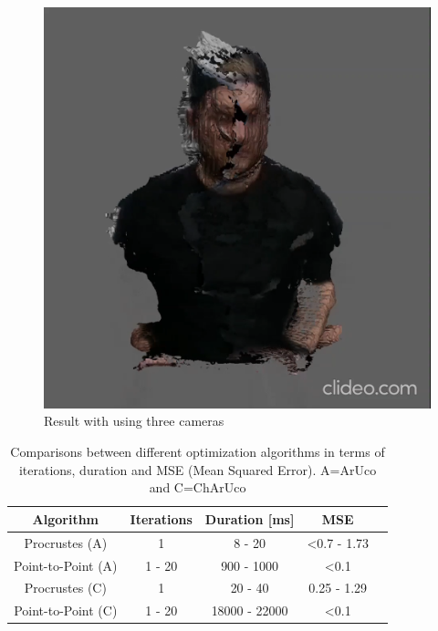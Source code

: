 \documentclass[10pt,twocolumn,letterpaper]{article}
\begin{document}
\begin{figure}[t]
\begin{center}
\includegraphics[width=0.65\linewidth]{imgs/res3}
\end{center}
 \caption{Result with using three cameras}
\end{figure}

\begin{table}[h!]
  \begin{center}
    \begin{tabular}{c|c|c|c p{4cm}}
      \textbf{Algorithm} & \textbf{Iterations} & \textbf{Duration [ms]} & \textbf{MSE}\\
      \hline
      Procrustes (A)  & 1 & 8 - 20 & \textless 0.7 - 1.73\\
      Point-to-Point (A) & 1 - 20 & 900 - 1000 & \textless 0.1\\
      Procrustes (C) & 1 & 20 - 40 & 0.25 - 1.29\\
      Point-to-Point (C) & 1 - 20 & 18000 - 22000 & \textless 0.1\\
    \end{tabular}
     \caption{Comparisons between different optimization algorithms in terms of iterations, duration and MSE (Mean Squared Error). A=ArUco and C=ChArUco}
     \label{tab:table1}
  \end{center}
\end{table}
\end{document}
